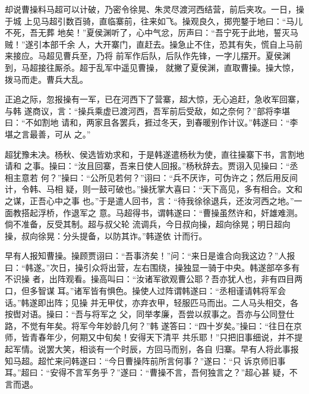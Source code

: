 却说曹操料马超可以计破，乃密令徐晃、朱灵尽渡河西结营，前后夹攻。一日，操于城
上见马超引数百骑，直临寨前，往来如飞。操观良久，掷兜鍪于地曰：“马儿不死，吾无葬
地矣！”夏侯渊听了，心中气忿，厉声曰：“吾宁死于此地，誓灭马贼！”遂引本部千余
人，大开寨门，直赶去。操急止不住，恐其有失，慌自上马前来接应。马超见曹兵至，乃将
前军作后队，后队作先锋，一字儿摆开。夏侯渊到，马超接往厮杀。超于乱军中遥见曹操，
就撇了夏侯渊，直取曹操。操大惊，拨马而走。曹兵大乱。

正追之际，忽报操有一军，已在河西下了营寨，超大惊，无心追赶，急收军回寨，与韩
遂商议，言：“操兵乘虚已渡河西，吾军前后受敌，如之奈何？”部将李堪曰：“不如割地
请和，两家且各罢兵，捱过冬天，到春暖别作计议。”韩遂曰：“李堪之言最善，可从
之。”

超犹豫未决。杨秋、侯选皆劝求和，于是韩遂遣杨秋为使，直往操寨下书，言割地请和
之事。操曰：“汝且回寨，吾来日使人回报。”杨秋辞去。贾诩入见操曰：“丞相主意若
何？”操曰：“公所见若何？”诩曰：“兵不厌诈，可伪许之；然后用反间计，令韩、马相
疑，则一鼓可破也。”操抚掌大喜曰：“天下高见，多有相合。文和之谋，正吾心中之事
也。”于是遣人回书，言：“待我徐徐退兵，还汝河西之地。”一面教搭起浮桥，作退军之
意。马超得书，谓韩遂曰：“曹操虽然许和，奸雄难测。倘不准备，反受其制。超与叔父轮
流调兵，今日叔向操，超向徐晃；明日超向操，叔向徐晃：分头提备，以防其诈。”韩遂依
计而行。

早有人报知曹操。操顾贾诩曰：“吾事济矣！”问：“来日是谁合向我这边？”人报
曰：“韩遂。”次日，操引众将出营，左右围绕，操独显一骑于中央。韩遂部卒多有不识操
者，出阵观看。操高叫曰：“汝诸军欲观曹公耶？吾亦犹人也，非有四目两口，但多智谋
耳。”诸军皆有惧色。操使人过阵谓韩遂曰：“丞相谨请韩将军会话。”韩遂即出阵；见操
并无甲仗，亦弃衣甲，轻服匹马而出。二人马头相交，各按辔对语。操曰：“吾与将军之
父，同举孝廉，吾尝以叔事之。吾亦与公同登仕路，不觉有年矣。将军今年妙龄几何？”韩
遂答曰：“四十岁矣。”操曰：“往日在京师，皆青春年少，何期又中旬矣！安得天下清平
共乐耶！”只把旧事细说，并不提起军情。说罢大笑，相谈有一个时辰，方回马而别，各自
归寨。早有人将此事报知马超。超忙来问韩遂曰：“今日曹操阵前所言何事？”遂曰：“只
诉京师旧事耳。”超曰：“安得不言军务乎？”遂曰：“曹操不言，吾何独言之？”超心甚
疑，不言而退。

